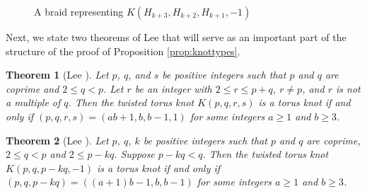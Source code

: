 \documentclass{amsart}
\newtheorem{theorem}{Theorem}
\begin{document}
	\begin{figure}
		\caption{A braid representing $K(H_{k+3}, H_{k+2}, H_{k+1}, -1)$ }\label{fig:lemma9.3}

\end{figure}

Next, we state two theorems of Lee that will serve as an important part of the structure of the proof of Proposition \ref{prop:knottypes}.

\begin{theorem}[Lee \cite{LeeTTKTorusPos}]\label{thm:ttktoruspos}
Let $p$, $q$, and $s$ be positive integers such that $p$ and $q$ are coprime and $2\le q <p$. Let $r$ be an integer with $2 \le r \le p + q$, $r\neq p$, and $r$ is not a multiple of $q$. Then the twisted torus knot $K(p,q,r, s)$ is a torus knot if and only if $(p,q,r,s) = (ab + 1,b, b-1, 1)$ for some integers $a \ge 1$ and $b \ge 3$.
\end{theorem}

\begin{theorem}[Lee \cite{LeeTTKTorus}]\label{thm:ttktorusqbig}
Let $p$, $q$, $k$ be positive integers such that $p$ and $q$ are coprime, $2\le q <p$ and $2 \le p - kq$. Suppose $p -kq < q$. Then the twisted torus knot $K(p,q,p-kq, -1)$ is a torus knot if and only if $(p,q,p-kq) = ((a+1)b-1, b, b-1)$ for some integers $a \ge 1$ and $b \ge 3$.
\end{theorem}

\vspace{.1in}
\end{document}
